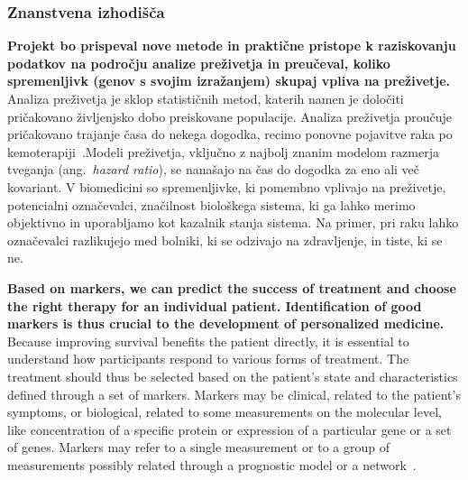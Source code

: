 \documentclass[11pt,a4paper]{article}
\renewcommand{\bold}{\textbf}
\begin{document}
\subsubsection*{Znanstvena izhodišča}

\bold{Projekt bo prispeval nove metode in praktične pristope k raziskovanju podatkov na področju analize preživetja in preučeval, koliko spremenljivk (genov s svojim izražanjem) skupaj vpliva na preživetje.} Analiza preživetja je sklop statističnih metod, katerih namen je določiti pričakovano življenjsko dobo preiskovane populacije. Analiza preživetja proučuje pričakovano trajanje časa do nekega dogodka, recimo ponovne pojavitve raka po kemoterapiji~\cite{pazdur2008endpoints}.Modeli preživetja, vključno z najbolj znanim modelom razmerja tveganja (ang.~{\em hazard ratio}), se nanašajo na čas do dogodka za eno ali več kovariant. V biomedicini so spremenljivke, ki pomembno vplivajo na preživetje, potencialni označevalci, značilnost biološkega sistema, ki ga lahko merimo objektivno in uporabljamo kot kazalnik stanja sistema. Na primer, pri raku lahko označevalci razlikujejo med bolniki, ki se odzivajo na zdravljenje, in tiste, ki se ne.

\bold{Based on markers, we can predict the success of treatment and choose the right therapy for an individual patient. Identification of good markers is thus crucial to the development of personalized medicine.} Because improving survival benefits the patient directly, it is essential to understand how participants respond to various forms of treatment. The treatment should thus be selected based on the patient's state and characteristics defined through a set of markers. Markers may be clinical, related to the patient's symptoms, or biological, related to some measurements on the molecular level, like concentration of a specific protein or expression of a particular gene or a set of genes. Markers may refer to a single measurement or to a group of measurements possibly related through a prognostic model or a network~\cite{Sonawane2019}.
\end{document}
